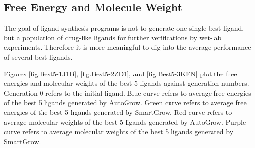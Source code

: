 \subsection{Free Energy and Molecule Weight}

The goal of ligand synthesis programs is not to generate one single best ligand, but a population of drug-like ligands for further verifications by wet-lab experiments. Therefore it is more meaningful to dig into the average performance of several best ligands.

Figures \ref{fig:Best5-1J1B}, \ref{fig:Best5-2ZD1}, and \ref{fig:Best5-3KFN} plot the free energies and molecular weights of the best 5 ligands against generation numbers. Generation 0 refers to the initial ligand. Blue curve refers to average free energies of the best 5 ligands generated by AutoGrow. Green curve refers to average free energies of the best 5 ligands generated by SmartGrow. Red curve refers to average molecular weights of the best 5 ligands generated by AutoGrow. Purple curve refers to average molecular weights of the best 5 ligands generated by SmartGrow.

